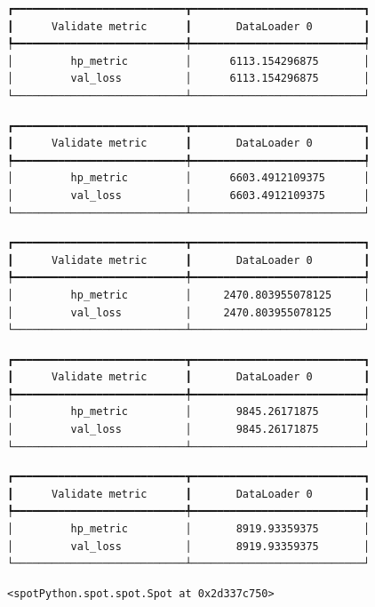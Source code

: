 \documentclass[
  letterpaper,
  DIV=11,
  numbers=noendperiod]{scrreprt}
\begin{document}
\begin{verbatim}
┏━━━━━━━━━━━━━━━━━━━━━━━━━━━┳━━━━━━━━━━━━━━━━━━━━━━━━━━━┓
┃      Validate metric      ┃       DataLoader 0        ┃
┡━━━━━━━━━━━━━━━━━━━━━━━━━━━╇━━━━━━━━━━━━━━━━━━━━━━━━━━━┩
│         hp_metric         │      6113.154296875       │
│         val_loss          │      6113.154296875       │
└───────────────────────────┴───────────────────────────┘
\end{verbatim}

\begin{verbatim}
┏━━━━━━━━━━━━━━━━━━━━━━━━━━━┳━━━━━━━━━━━━━━━━━━━━━━━━━━━┓
┃      Validate metric      ┃       DataLoader 0        ┃
┡━━━━━━━━━━━━━━━━━━━━━━━━━━━╇━━━━━━━━━━━━━━━━━━━━━━━━━━━┩
│         hp_metric         │      6603.4912109375      │
│         val_loss          │      6603.4912109375      │
└───────────────────────────┴───────────────────────────┘
\end{verbatim}

\begin{verbatim}
┏━━━━━━━━━━━━━━━━━━━━━━━━━━━┳━━━━━━━━━━━━━━━━━━━━━━━━━━━┓
┃      Validate metric      ┃       DataLoader 0        ┃
┡━━━━━━━━━━━━━━━━━━━━━━━━━━━╇━━━━━━━━━━━━━━━━━━━━━━━━━━━┩
│         hp_metric         │     2470.803955078125     │
│         val_loss          │     2470.803955078125     │
└───────────────────────────┴───────────────────────────┘
\end{verbatim}

\begin{verbatim}
┏━━━━━━━━━━━━━━━━━━━━━━━━━━━┳━━━━━━━━━━━━━━━━━━━━━━━━━━━┓
┃      Validate metric      ┃       DataLoader 0        ┃
┡━━━━━━━━━━━━━━━━━━━━━━━━━━━╇━━━━━━━━━━━━━━━━━━━━━━━━━━━┩
│         hp_metric         │       9845.26171875       │
│         val_loss          │       9845.26171875       │
└───────────────────────────┴───────────────────────────┘
\end{verbatim}

\begin{verbatim}
┏━━━━━━━━━━━━━━━━━━━━━━━━━━━┳━━━━━━━━━━━━━━━━━━━━━━━━━━━┓
┃      Validate metric      ┃       DataLoader 0        ┃
┡━━━━━━━━━━━━━━━━━━━━━━━━━━━╇━━━━━━━━━━━━━━━━━━━━━━━━━━━┩
│         hp_metric         │       8919.93359375       │
│         val_loss          │       8919.93359375       │
└───────────────────────────┴───────────────────────────┘
\end{verbatim}

\begin{verbatim}
<spotPython.spot.spot.Spot at 0x2d337c750>
\end{verbatim}
\end{document}
